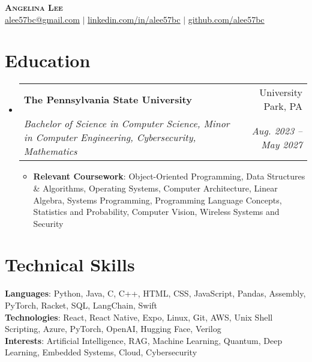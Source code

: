 \documentclass[letterpaper,11pt]{article}
\makeatletter
\newcommand{\resumeItem}[1]{
  \item\small{
    {#1 \vspace{-2pt}}
  }
}
\newcommand{\resumeSubheading}[4]{
  \vspace{-2pt}\item
    \begin{tabular*}{0.97\textwidth}[t]{l@{\extracolsep{\fill}}r}
      \textbf{#1} & #2 \\
      \textit{\small#3} & \textit{\small #4} \\
    \end{tabular*}\vspace{-7pt}
}
\newcommand{\resumeSubHeadingListStart}{\begin{itemize}[leftmargin=0.15in, label={}]}
\newcommand{\resumeSubHeadingListEnd}{\end{itemize}}
\newcommand{\resumeItemListStart}{\begin{itemize}}
\newcommand{\resumeItemListEnd}{\end{itemize}\vspace{-5pt}}
\makeatother
\begin{document}
\begin{center}
    \textbf{\Huge \scshape Angelina Lee} \\ \vspace{1pt}
    \small \href{alee57bc@gmail.com}{\underline{alee57bc@gmail.com}} $|$ 
    \href{https://www.linkedin.com/in/alee57bc/}{\underline{linkedin.com/in/alee57bc}} $|$
    \href{https://github.com/alee57bc}{\underline{github.com/alee57bc}}
    \vspace{-6pt}
\end{center}

\section{Education}
    \resumeSubHeadingListStart
    \resumeSubheading
        {The Pennsylvania State University}{University Park, PA}
        {Bachelor of Science in Computer Science, Minor in Computer Engineering, Cybersecurity, Mathematics}{Aug. 2023 -- May 2027}
        \resumeItemListStart
            \resumeItem{\textbf{Relevant Coursework}: \footnotesize  Object-Oriented Programming, Data Structures \& Algorithms, Operating Systems, Computer Architecture, Linear Algebra, Systems Programming, Programming Language Concepts, Statistics and Probability, Computer Vision, Wireless Systems and Security}       
        \resumeItemListEnd
    \vspace{-9pt}
    \resumeSubHeadingListEnd

\section{Technical Skills}
\begin{itemize}[leftmargin=0.15in, label={}]
    \small{\item{
    \textbf{Languages}{: Python, Java, C, C++, HTML, CSS, JavaScript, Pandas, Assembly, PyTorch, Racket, SQL, LangChain, Swift} \\
    \textbf{Technologies}{:  React, React Native, Expo, Linux, Git, AWS, Unix Shell Scripting, Azure, PyTorch, OpenAI, Hugging Face, Verilog} \\
    \textbf{Interests}{: Artificial Intelligence, RAG, Machine Learning, Quantum, Deep Learning, Embedded Systems, Cloud, Cybersecurity}
    }}
\vspace{-10pt}
\end{itemize}

\end{document}

